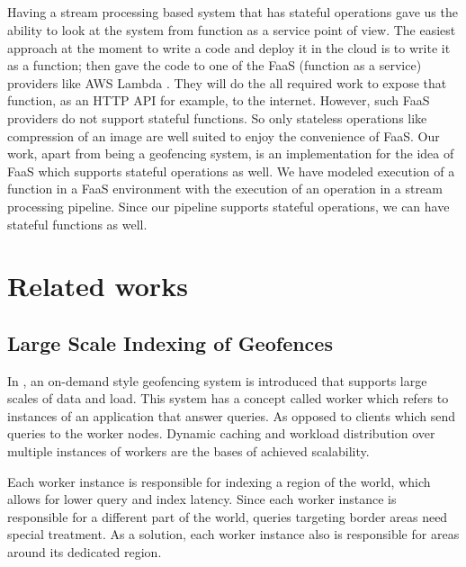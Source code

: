 \documentclass[a4]{report}
\begin{document}
    \paragraph{}
    Having a stream processing based system that has stateful operations gave us the ability to look at the system from
    function as a service\cite{whatisfaas} point of view.
    The easiest approach at the moment to write a code and deploy it in the cloud is to write it as a function;
    then gave the code to one of the FaaS (function as a service) providers like AWS Lambda \cite{lambda}.
    They will do the all required work to expose that function, as an HTTP API for example, to the internet.
    However, such FaaS providers do not support stateful functions.
    So only stateless operations like compression of an image are well suited to enjoy the convenience of FaaS.
    Our work, apart from being a geofencing system, is an implementation for the idea of FaaS which supports stateful operations as well.
    We have modeled execution of a function in a FaaS environment with the execution of an operation in a stream
    processing pipeline.
    Since our pipeline supports stateful operations, we can have stateful functions as well.


    \chapter{Related works}


    \section{Large Scale Indexing of Geofences}
    In \cite{Cirillo-Jacobs-Martin-Szczytowski-2014}, an on-demand style geofencing system is introduced that
    supports large scales of data and load.
    This system has a concept called worker which refers to instances of an application that answer queries.
    As opposed to clients which send queries to the worker nodes.
    Dynamic caching and workload distribution over multiple instances of workers are the bases of achieved scalability.

    Each worker instance is responsible for indexing a region of the world, which allows for lower query and index latency.
    Since each worker instance is responsible for a different part of the world, queries targeting border areas need special treatment.
    As a solution, each worker instance also is responsible for areas around its dedicated region.
\end{document}
